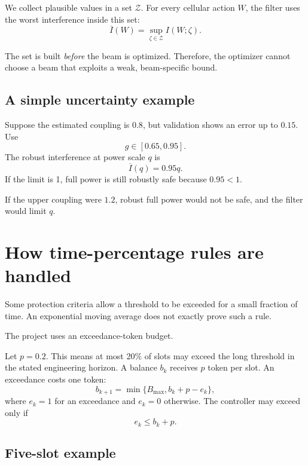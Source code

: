 \documentclass[11pt]{article}
\begin{document}
We collect plausible values in a set $\mathcal Z$. For every cellular action $W$, the filter uses the worst interference inside this set:
\begin{equation}
 \overline I(W)=\sup_{\zeta\in\mathcal Z}I(W;\zeta).
\end{equation}

The set is built \emph{before} the beam is optimized. Therefore, the optimizer cannot choose a beam that exploits a weak, beam-specific bound.

\subsection{A simple uncertainty example}

Suppose the estimated coupling is $0.8$, but validation shows an error up to $0.15$. Use
\begin{equation}
 g\in[0.65,0.95].
\end{equation}
The robust interference at power scale $q$ is
\begin{equation}
 \overline I(q)=0.95q.
\end{equation}
If the limit is 1, full power is still robustly safe because $0.95<1$.

If the upper coupling were $1.2$, robust full power would not be safe, and the filter would limit $q$.

\section{How time-percentage rules are handled}

Some protection criteria allow a threshold to be exceeded for a small fraction of time. An exponential moving average does not exactly prove such a rule.

The project uses an exceedance-token budget.

Let $p=0.2$. This means at most 20\% of slots may exceed the long threshold in the stated engineering horizon. A balance $b_k$ receives $p$ token per slot. An exceedance costs one token:
\begin{equation}
 b_{k+1}=\min\{B_{\max},b_k+p-e_k\},
\end{equation}
where $e_k=1$ for an exceedance and $e_k=0$ otherwise. The controller may exceed only if
\begin{equation}
 e_k\le b_k+p.
\end{equation}

\subsection{Five-slot example}
\end{document}
